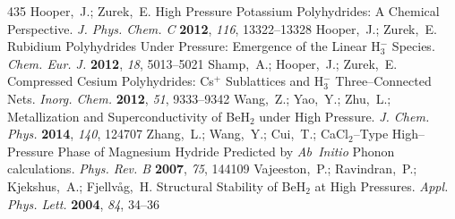 \documentclass[12pt,letterpaper,oneside]{article}
\begin{document}
\begin{mcitethebibliography}{435}
\EndOfBibitem
{}
Hooper,~J.; Zurek,~E. High Pressure Potassium Polyhydrides: A Chemical
  Perspective. \emph{J. Phys. Chem. C} \textbf{2012}, \emph{116},
  13322--13328\relax
\mciteBstWouldAddEndPuncttrue
\mciteSetBstMidEndSepPunct{\mcitedefaultmidpunct}
{\mcitedefaultendpunct}{\mcitedefaultseppunct}\relax
\EndOfBibitem
{}
Hooper,~J.; Zurek,~E. Rubidium Polyhydrides Under Pressure: Emergence of the
  Linear H$_3^-$ Species. \emph{Chem. Eur. J.} \textbf{2012}, \emph{18},
  5013--5021\relax
\mciteBstWouldAddEndPuncttrue
\mciteSetBstMidEndSepPunct{\mcitedefaultmidpunct}
{\mcitedefaultendpunct}{\mcitedefaultseppunct}\relax
\EndOfBibitem
{}
Shamp,~A.; Hooper,~J.; Zurek,~E. Compressed Cesium Polyhydrides: Cs$^+$
  Sublattices and H$_3^-$ Three--Connected Nets. \emph{Inorg. Chem.}
  \textbf{2012}, \emph{51}, 9333--9342\relax
\mciteBstWouldAddEndPuncttrue
\mciteSetBstMidEndSepPunct{\mcitedefaultmidpunct}
{\mcitedefaultendpunct}{\mcitedefaultseppunct}\relax
\EndOfBibitem
{}
Wang,~Z.; Yao,~Y.; Zhu,~L.;   Metallization
  and Superconductivity of BeH$_2$ under High Pressure. \emph{J. Chem. Phys.}
  \textbf{2014}, \emph{140}, 124707\relax
\mciteBstWouldAddEndPuncttrue
\mciteSetBstMidEndSepPunct{\mcitedefaultmidpunct}
{\mcitedefaultendpunct}{\mcitedefaultseppunct}\relax
\EndOfBibitem
{}
Zhang,~L.; Wang,~Y.; Cui,~T.;   CaCl$_2$--Type
  High--Pressure Phase of Magnesium Hydride Predicted by \emph{Ab~Initio} Phonon
  calculations. \emph{Phys. Rev. B} \textbf{2007}, \emph{75}, 144109\relax
\mciteBstWouldAddEndPuncttrue
\mciteSetBstMidEndSepPunct{\mcitedefaultmidpunct}
{\mcitedefaultendpunct}{\mcitedefaultseppunct}\relax
\EndOfBibitem
{}
Vajeeston,~P.; Ravindran,~P.; Kjekshus,~A.; Fjellv{\aa}g,~H. Structural
  Stability of BeH$_2$ at High Pressures. \emph{Appl. Phys. Lett.}
  \textbf{2004}, \emph{84}, 34--36\relax
\mciteBstWouldAddEndPuncttrue
\mciteSetBstMidEndSepPunct{\mcitedefaultmidpunct}
{\mcitedefaultendpunct}{\mcitedefaultseppunct}\relax
\EndOfBibitem
{}

\end{mcitethebibliography}
\end{document}
